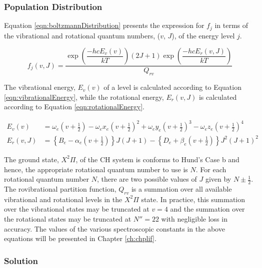 \subsubsection{Population Distribution}
\label{subsubsec:improved-model-population-distribution}

Equation \ref{eqn:boltzmannDistribution} presents the expression for \(f_j\) in terms of the vibrational and rotational quantum numbers, (\(v\), \(J\)), of the energy level \(j\).

\begin{equation}
  f_j(v,J) = \frac{ \exp{\left(\dfrac{-hcE_v(v)}{kT}\right)} (2J + 1)\exp{\left(\dfrac{-hcE_r(v, J)}{kT}\right)} }{ Q_{rv} }
  \label{eqn:boltzmannDistribution}
\end{equation}

The vibrational energy, \(E_v(v)\) of a level is calculated according to Equation \ref{eqn:vibrationalEnergy}, while the rotational energy, \(E_r(v,J)\) is calculated according to Equation \ref{eqn:rotationalEnergy}.

\begin{align}
  E_v(v) &= \omega_e \left(v+\frac{1}{2}\right) - \omega_ex_e \left(v+\frac{1}{2}\right)^2 + \omega_ey_e \left(v+\frac{1}{2}\right)^3 - \omega_ez_e \left(v+\frac{1}{2}\right)^4
  \label{eqn:vibrationalEnergy}\\
  E_r(v, J) &= \left\{B_e - \alpha_e \left(v+\frac{1}{2}\right)\right\}J(J+1) - \left\{D_e + \beta_e \left(v+\frac{1}{2}\right)\right\}J^2(J+1)^2
  \label{eqn:rotationalEnergy}
\end{align}

The ground state, \(X^2\Pi\), of the CH system is conforms to Hund's Case b\cite{1987-bernath} and hence, the appropriate rotational quantum number to use is \(N\).
For each rotational quantum number \(N\), there are two possible values of \(J\) given by \(N \pm \frac{1}{2}\).
The rovibrational partition function, \(Q_{rv}\) is a summation over all available vibrational and rotational levels in the \(X^2\Pi\) state.
In practice, this summation over the vibrational states may be truncated at \(v=4\) and the summation over the rotational states may be truncated at \(N''=22\) with negligible loss in accuracy.
The values of the various spectroscopic constants in the above equations will be presented in Chapter \ref{ch:chplif}.

\subsubsection{Solution}
\label{subsubsec:improved-model-solution}


